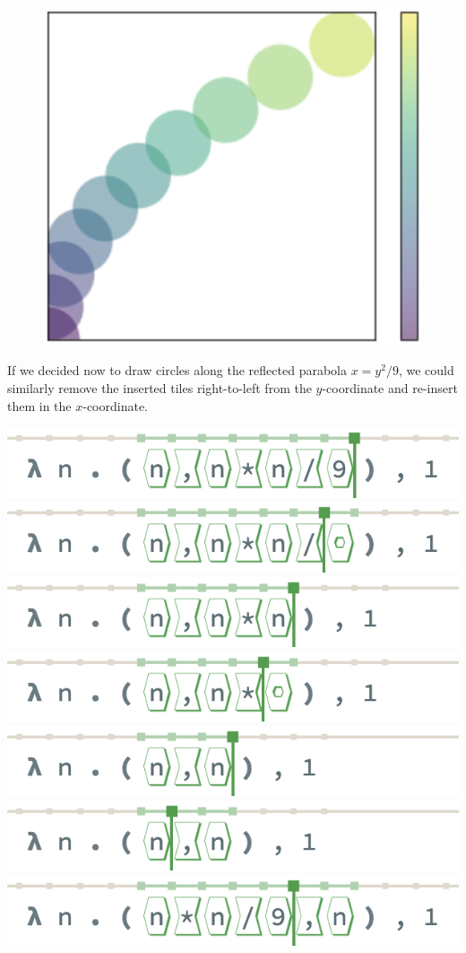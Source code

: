 \setlength\intextsep{0pt}
\begin{figure}
  \centering
  \hspace*{-0.07\columnwidth}
  \includegraphics[width=0.15\columnwidth]{img/circles-parabola-transpose.png}
\end{figure}

If we decided now to draw circles along the reflected
parabola $x = y^2/9$, we could similarly remove the inserted
tiles right-to-left from the $y$-coordinate and re-insert
them in the $x$-coordinate.

\begin{center}
  \includegraphics[width=0.65\columnwidth]{img/removal-0.png}
  \includegraphics[width=0.65\columnwidth]{img/removal-1.png}
  \includegraphics[width=0.65\columnwidth]{img/removal-2.png}
  \includegraphics[width=0.65\columnwidth]{img/removal-3.png}
  \includegraphics[width=0.65\columnwidth]{img/removal-4.png}
  \includegraphics[width=0.65\columnwidth]{img/removal-5.png}
  \includegraphics[width=0.65\columnwidth]{img/removal-6.png}
\end{center}

